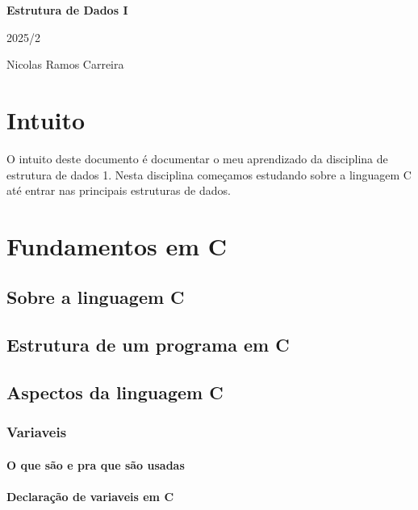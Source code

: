 \documentclass{report}
\begin{document}
	
	\begin{titlepage}
		
		\centering
		\vspace*{5cm} %
		
		{\Huge\bfseries Estrutura de Dados I\par} %
		
		\vspace{0.5cm}
		{\Large 2025/2\par} %
		
		\vfill
		{\large Nicolas Ramos Carreira\par} %
		
		\vspace*{2cm}
	\end{titlepage}
	
	\tableofcontents
	\newpage
	
	\chapter{Intuito}
	
	O intuito deste documento é documentar o meu aprendizado da disciplina de estrutura de dados 1. Nesta disciplina começamos estudando sobre a linguagem C até entrar nas principais estruturas de dados. 
	
	\chapter{Fundamentos em C}
	\section{Sobre a linguagem C}
	\section{Estrutura de um programa em C}
	\section{Aspectos da linguagem C}
	\subsection{Variaveis}
	\subsubsection{O que são e pra que são usadas}
	\subsubsection{Declaração de variaveis em C}
\end{document}

